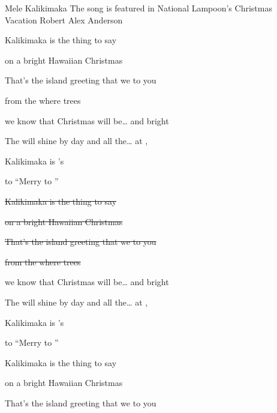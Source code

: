 \begin{SBSong}{Mele Kalikimaka}
    {The song is featured in National Lampoon's Christmas Vacation}
    {Robert Alex Anderson}
  \SBDirection{}
  \begin{SBVerse}
     Kalikimaka is the thing to say 
    
    on a bright Hawaiian Christmas 
    
    That's the island greeting that we  to you 
    
    from the  where  trees 
    
     we know that Christmas will be\ldots {} and bright 
    
    The  will shine by day and all the\ldots {} at ,
    
     Kalikimaka is 's  
    
    to  ``Merry  to '' 
  \end{SBVerse}
  \begin{SBVerse}
    \sout{ Kalikimaka is the thing to say}
    
    \sout{on a bright Hawaiian Christmas }
    
    \sout{That's the island greeting that we  to you}
    
    \sout{from the  where  trees }
    
     we know that Christmas will be\ldots {} and bright 
    
    The  will shine by day and all the\ldots {} at ,
    
     Kalikimaka is 's  
    
    to  ``Merry  to '' 
  \end{SBVerse}
  \begin{SBVerse}
     Kalikimaka is the thing to say 
    
    on a bright Hawaiian Christmas 
    
    That's the island greeting that we  to you 
    

\end{SBVerse}
\end{SBSong}
